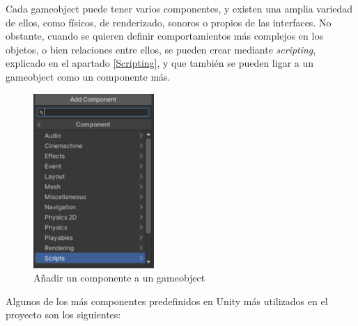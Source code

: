Cada gameobject puede tener varios componentes, y existen una amplia variedad de ellos, como físicos, de renderizado, sonoros o propios de las interfaces. No obstante, cuando se quieren definir comportamientos más complejos en los objetos, o bien relaciones entre ellos, se pueden crear mediante \textit{scripting}, explicado en el apartado \ref{Scripting}, y que también se pueden ligar a un gameobject como un componente más.
\begin{figure}[h]
	\centering
	\includegraphics[scale=1]{img/addComponent.png}
	\caption{Añadir un componente a un gameobject}
	\label{fig:componente}
\end{figure}
Algunos de los más componentes predefinidos en Unity más utilizados en el proyecto son los siguientes:
